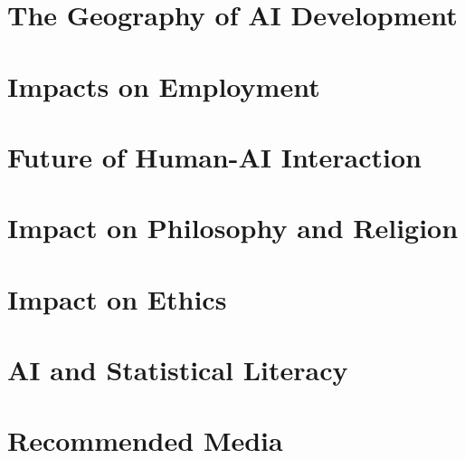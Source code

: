 \documentclass{beamer}
\begin{document}
  \section{The Geography of AI Development}
  \section{Impacts on Employment}
  \section{Future of Human-AI Interaction}
  \section{Impact on Philosophy and Religion}
  \section{Impact on Ethics}
  \section{AI and Statistical Literacy}
  \section{Recommended Media}
  
\end{document}
